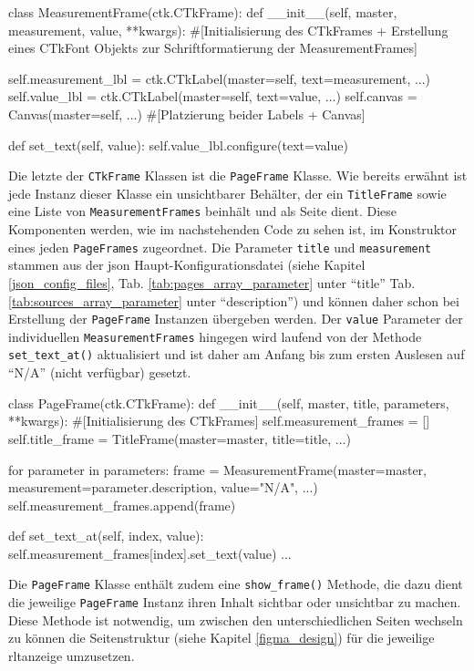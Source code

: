\begin{pythoncode}
class MeasurementFrame(ctk.CTkFrame):
	def __init__(self, master, measurement, value, **kwargs):
		#[Initialisierung des CTkFrames + Erstellung eines CTkFont Objekts zur Schriftformatierung der MeasurementFrames]
		
		self.measurement_lbl = ctk.CTkLabel(master=self, text=measurement, ...)
		self.value_lbl = ctk.CTkLabel(master=self, text=value, ...)
		self.canvas = Canvas(master=self, ...)
		#[Platzierung beider Labels + Canvas]
		
	def set_text(self, value):
		self.value_lbl.configure(text=value)
\end{pythoncode}

Die letzte der \lstinline{CTkFrame} Klassen ist die \lstinline{PageFrame} Klasse. Wie bereits erwähnt ist jede Instanz dieser Klasse ein unsichtbarer Behälter, der ein \lstinline{TitleFrame} sowie eine Liste von \lstinline{MeasurementFrames} beinhält und als Seite dient. Diese Komponenten werden, wie im nachstehenden Code zu sehen ist, im Konstruktor eines jeden \lstinline{PageFrames} zugeordnet. Die Parameter \lstinline{title} und \lstinline{measurement} stammen aus der \acs{json} Haupt-Konfigurationsdatei (siehe Kapitel \ref{json_config_files}, Tab. \ref{tab:pages_array_parameter} unter \enquote{title} \bzw Tab. \ref{tab:sources_array_parameter}  unter \enquote{description}) und können daher schon bei Erstellung der \lstinline{PageFrame} Instanzen übergeben werden. Der \lstinline{value} Parameter der individuellen \lstinline{MeasurementFrames} hingegen wird laufend von der Methode \lstinline{set_text_at()} aktualisiert und ist daher am Anfang bis zum ersten Auslesen auf \enquote{N/A} (\dt nicht verfügbar) gesetzt.
	
\begin{pythoncode}
class PageFrame(ctk.CTkFrame):
	def __init__(self, master, title, parameters, **kwargs):
		#[Initialisierung des CTkFrames]
		self.measurement_frames = []
		self.title_frame = TitleFrame(master=master, title=title, ...)
		
		for parameter in parameters:
			frame = MeasurementFrame(master=master, measurement=parameter.description, value="N/A", ...)
			self.measurement_frames.append(frame)

    def set_text_at(self, index, value):
        self.measurement_frames[index].set_text(value)
...
\end{pythoncode}

Die \lstinline{PageFrame} Klasse enthält zudem eine \lstinline{show_frame()} Methode, die dazu dient die jeweilige \lstinline{PageFrame} Instanz \bzw ihren Inhalt sichtbar oder unsichtbar zu machen. Diese Methode ist notwendig, um zwischen den unterschiedlichen Seiten wechseln zu können \bzw die Seitenstruktur (siehe Kapitel \ref{figma_design}) für die jeweilige \acs{rltanzeige} umzusetzen.

